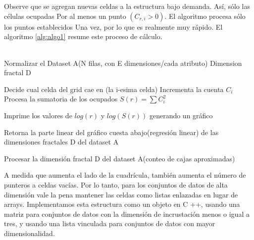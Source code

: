 \\\\
Observe que se agregan nuevas celdas a la estructura bajo demanda. Así, sólo las células ocupadas
Por al menos un punto $(C_{r,i}> 0)$. El algoritmo procesa sólo los puntos establecidos
Una vez, por lo que es realmente muy rápido. El algoritmo \ref{alg:algo1} resume este proceso de cálculo.
\\\\
\begin{algorithm}
\begin{algorithmic}[1]
\REQUIRE Normalizar el Dataset A(N filas, con E dimensiones/cada atributo)
\label{lin:lineaRara}
\ENSURE  Dimension fractal D

    \STATE Decide cual celda del grid cae en (la i-esima celda)
    \STATE Incrementa la cuenta $C_i$
    \ENDFOR
    \STATE Procesa la sumatoria de los ocupados $S(r) = \sum C_i^2$
\ENDFOR

\STATE Imprime los valores de $log(r)$ y $log(S(r))$ generando un gráfico

\STATE Retorna la parte linear del gráfico cuesta abajo(regresión linear) de las dimensiones fractales D del dataset A

\end{algorithmic}
\caption{Procesar la dimensión fractal D del dataset A(conteo de cajas aproximadas)}
\label{alg:algo1}
\end{algorithm}
 
A medida que aumenta el lado de la cuadrícula, también aumenta el número de punteros a celdas vacías. Por lo tanto, para los conjuntos de datos de alta dimensión vale la pena mantener las celdas como listas enlazadas en lugar de arrays. Implementamos esta estructura como un objeto en C ++, usando una matriz para conjuntos de datos con la dimensión de incrustación menos o igual a tres, y usando una lista vinculada para conjuntos de datos con mayor dimensionalidad.	\\
